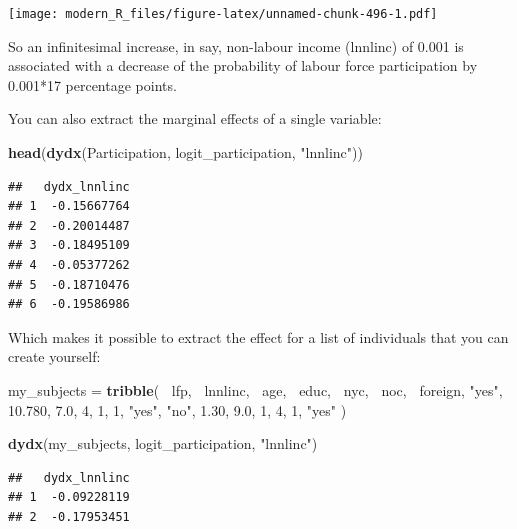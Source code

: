 \documentclass[]{gitbook}
\newenvironment{Shaded}{\begin{snugshade}}{\end{snugshade}}
\newcommand{\DecValTok}[1]{\textcolor[rgb]{0.00,0.00,0.81}{#1}}
\newcommand{\FloatTok}[1]{\textcolor[rgb]{0.00,0.00,0.81}{#1}}
\newcommand{\KeywordTok}[1]{\textcolor[rgb]{0.13,0.29,0.53}{\textbf{#1}}}
\newcommand{\NormalTok}[1]{#1}
\newcommand{\OperatorTok}[1]{\textcolor[rgb]{0.81,0.36,0.00}{\textbf{#1}}}
\newcommand{\StringTok}[1]{\textcolor[rgb]{0.31,0.60,0.02}{#1}}
\begin{document}
\texttt{[image: modern\_R\_files/figure-latex/unnamed-chunk-496-1.pdf]}

So an infinitesimal increase, in say, non-labour income (lnnlinc) of 0.001 is associated with a
decrease of the probability of labour force participation by 0.001*17 percentage points.

You can also extract the marginal effects of a single variable:

\begin{Shaded}
\begin{Highlighting}[]
\KeywordTok{head}\NormalTok{(}\KeywordTok{dydx}\NormalTok{(Participation, logit_participation, }\StringTok{"lnnlinc"}\NormalTok{))}
\end{Highlighting}
\end{Shaded}

\begin{verbatim}
##   dydx_lnnlinc
## 1  -0.15667764
## 2  -0.20014487
## 3  -0.18495109
## 4  -0.05377262
## 5  -0.18710476
## 6  -0.19586986
\end{verbatim}

Which makes it possible to extract the effect for a list of individuals that you can create yourself:

\begin{Shaded}
\begin{Highlighting}[]
\NormalTok{my_subjects =}\StringTok{ }\KeywordTok{tribble}\NormalTok{(}
    \OperatorTok{~}\NormalTok{lfp,  }\OperatorTok{~}\NormalTok{lnnlinc, }\OperatorTok{~}\NormalTok{age, }\OperatorTok{~}\NormalTok{educ, }\OperatorTok{~}\NormalTok{nyc, }\OperatorTok{~}\NormalTok{noc, }\OperatorTok{~}\NormalTok{foreign,}
    \StringTok{"yes"}\NormalTok{,   }\FloatTok{10.780}\NormalTok{,  }\FloatTok{7.0}\NormalTok{,     }\DecValTok{4}\NormalTok{,    }\DecValTok{1}\NormalTok{,   }\DecValTok{1}\NormalTok{,     }\StringTok{"yes"}\NormalTok{,}
     \StringTok{"no"}\NormalTok{,     }\FloatTok{1.30}\NormalTok{,  }\FloatTok{9.0}\NormalTok{,     }\DecValTok{1}\NormalTok{,    }\DecValTok{4}\NormalTok{,   }\DecValTok{1}\NormalTok{,     }\StringTok{"yes"}
\NormalTok{)}

\KeywordTok{dydx}\NormalTok{(my_subjects, logit_participation, }\StringTok{"lnnlinc"}\NormalTok{)}
\end{Highlighting}
\end{Shaded}

\begin{verbatim}
##   dydx_lnnlinc
## 1  -0.09228119
## 2  -0.17953451
\end{verbatim}
\end{document}
